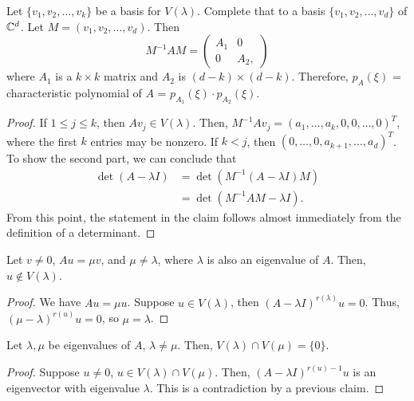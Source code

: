 \documentclass{article}
\begin{document}
\begin{theorem}[Claim.]{}
    Let $\{v_1, v_2, \hdots, v_{k}\}$ be a basis for $V(\lambda)$. Complete that to a basis $\{v_1, v_2, \hdots, v_d \}$ of $\mathbb{C}^d$. Let $M = (v_1, v_2, \hdots, v_d)$. Then 
    \[
        M^{-1} A M =
        \begin{pmatrix}
            A_1 & 0 \\
            0 & A_2,
        \end{pmatrix}
    \] 
    where $A_1$ is a $k \times k$ matrix and $A_2$ is $(d - k) \times (d- k)$. Therefore, $p_A(\xi)$ = characteristic polynomial of $A$ = $p_{A_1}(\xi) \cdot p_{A_2}(\xi)$.
\end{theorem}
\begin{proof}
    If $1 \leq j \leq k$, then $Av_j \in V(\lambda)$. Then, $M^{-1} A v_j = (a_1, \hdots, a_k, 0, 0, \hdots, 0)^T$, where the first $k$ entries may be nonzero. If $k < j$, then $(0, \hdots, 0, a_{k + 1}, \hdots, a_d)^T$. To show the second part, we can conclude that 
    \begin{align*}
        \det(A - \lambda I) &= \det(M^{-1}(A - \lambda I)M) \\
        &= \det(M^{-1}AM - \lambda I).
    \end{align*}
    From this point, the statement in the claim follows almost immediately from the definition of a determinant.
\end{proof}

\begin{theorem}[Claim.]{}
    Let $v \neq 0$, $Au = \mu v$, and $\mu \neq \lambda$, where $\lambda$ is also an eigenvalue of $A$. Then, $u \notin V(\lambda)$. 
\end{theorem}

\begin{proof}
    We have $Au = \mu u$. Suppose $u \in V(\lambda)$, then $(A - \lambda I)^{r(\lambda)}u = 0$. Thus, $(\mu - \lambda)^{r(u)}u = 0$, so $\mu = \lambda$. 
\end{proof}


\begin{theorem}[Claim.]{}
    Let $\lambda, \mu$ be eigenvalues of $A$, $\lambda \neq \mu$. Then, $V(\lambda) \cap V(\mu) = \{0\}$. 
\end{theorem}

\begin{proof}
    Suppose $u \neq 0$, $u \in V(\lambda) \cap V(\mu)$. Then, $(A - \lambda I)^{r(u) -1} u$ is an eigenvector with eigenvalue $\lambda$. This is a contradiction by a previous claim.  
\end{proof}
\end{document}

